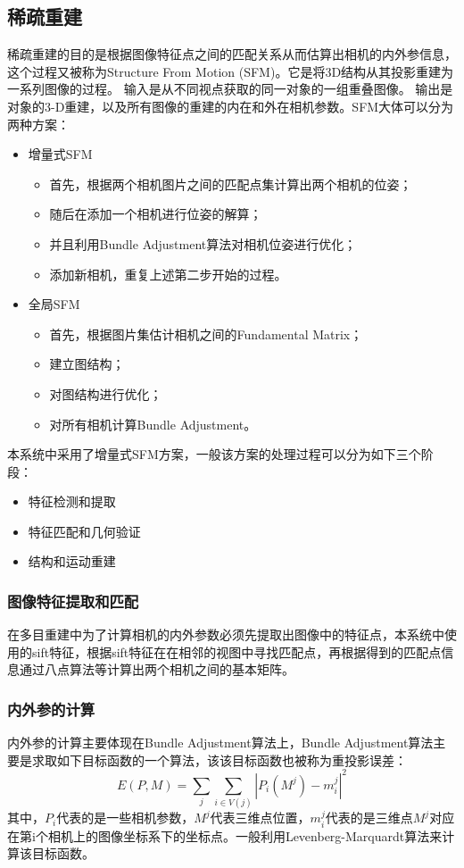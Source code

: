 \documentclass[10pt]{article}
\begin{document}
\subsection{稀疏重建}
稀疏重建的目的是根据图像特征点之间的匹配关系从而估算出相机的内外参信息，这个过程又被称为Structure From Motion (SFM)。它是将3D结构从其投影重建为一系列图像的过程。 输入是从不同视点获取的同一对象的一组重叠图像。 输出是对象的3-D重建，以及所有图像的重建的内在和外在相机参数。SFM大体可以分为两种方案：
\begin{itemize}
\item{增量式SFM}
\begin{itemize}
\item{首先，根据两个相机图片之间的匹配点集计算出两个相机的位姿；}
\item{随后在添加一个相机进行位姿的解算；}
\item{并且利用Bundle Adjustment算法对相机位姿进行优化；}
\item{添加新相机，重复上述第二步开始的过程。}
\end{itemize}


\item{全局SFM}
\begin{itemize}
\item{首先，根据图片集估计相机之间的Fundamental Matrix；}
\item{建立图结构；}
\item{对图结构进行优化；}
\item{对所有相机计算Bundle Adjustment。}
\end{itemize}
\end{itemize}
本系统中采用了增量式SFM方案，一般该方案的处理过程可以分为如下三个阶段：
\begin{itemize}
\item{特征检测和提取}
\item{特征匹配和几何验证}
\item{结构和运动重建}
\end{itemize}
\subsubsection{图像特征提取和匹配}
在多目重建中为了计算相机的内外参数必须先提取出图像中的特征点，本系统中使用的sift特征，根据sift特征在在相邻的视图中寻找匹配点，再根据得到的匹配点信息通过八点算法等计算出两个相机之间的基本矩阵。
\subsubsection{内外参的计算}
内外参的计算主要体现在Bundle Adjustment算法上，Bundle Adjustment算法主要是求取如下目标函数的一个算法，该该目标函数也被称为重投影误差：
\begin{equation}
E(P,M)=\sum_j \sum_{i \in V(j)} |P_i(M^j)-m_i^j|^2
\end{equation}
其中，${P_i}$代表的是一些相机参数，$M^j$代表三维点位置，$m_i^j$代表的是三维点$M^j$对应在第i个相机上的图像坐标系下的坐标点。一般利用Levenberg-Marquardt算法来计算该目标函数。
\end{document}
